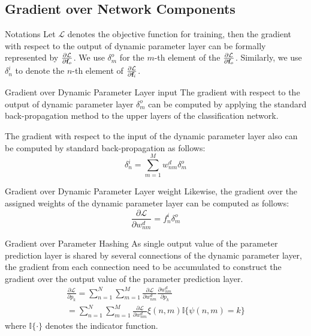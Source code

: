 \documentclass[10pt,twocolumn,letterpaper]{article}
\begin{document}
\subsection{Gradient over Network Components}
{\color{blue} Notations}
Let ${\mathcal{L}}$ denotes the objective function for training, then the gradient {\color{cyan}with respect to} the output of dynamic parameter layer can be formally represented by $\frac{\partial\mathcal{L}}{\partial {\bf{f}}_{o}}$.
We use $\delta^{o}_{m}$ for the $m$-th element of the $\frac{\partial\mathcal{L}}{\partial {\bf{f}}_{o}}$.
Similarly, we use $\delta^{i}_{n}$ to denote the $n$-th element of $\frac{\partial\mathcal{L}}{\partial {\bf{f}}_{i}}$.

{\color{blue} Gradient over Dynamic Parameter Layer input}
The gradient {\color{cyan}with respect to} the output of dynamic parameter layer $\delta^{o}_{m}$ can be computed by {\color{blue}applying the} standard back-propagation {\color{cyan}method to the upper layers of the classification network}. 

The gradient {\color{cyan}with respect to} the input of {\color{cyan}the dynamic} parameter layer also can be computed by standard back-propagation as follows:
\begin{equation}
{\delta}^{i}_n = \sum _{ m=1 }^{ M }{ w^d_{nm}\delta^o_{m} } 
\end{equation}

{\color{blue} Gradient over Dynamic Parameter Layer weight}
Likewise, the gradient over the assigned weights of the dynamic parameter layer can be computed as follows:
\begin{equation}
{\frac{\partial\mathcal{L}}{\partial w^{d}_{nm}}}=f^{i}_{n}{\delta}^{o}_{m}
\end{equation}

{\color{blue} Gradient over Parameter Hashing}
As single output value of the parameter prediction layer is shared by several connections of the dynamic parameter layer, the gradient from each connection need to be accumulated to construct the gradient over the output value of the parameter prediction layer\cite{Hashing}.
\begin{multline}
{\frac{\partial\mathcal{L}}{\partial p_{k}}}
= \sum _{n=1}^{\scriptscriptstyle N}{\sum _{m=1}^{\scriptscriptstyle M}{   {\frac{\partial\mathcal{L}}{\partial w^d_{nm}}} {\frac{\partial w^d_{nm}}{\partial p_{k}}}}} \\
= \sum _{n=1}^{\scriptscriptstyle N}{\sum _{m=1}^{\scriptscriptstyle M} {  {\frac{\partial\mathcal{L}}{\partial w^d_{nm}}}   {\xi(n,m)}  {{\mathbb{I}}\{ \psi(n,m)=k \}}      }}
\end{multline}
where ${\mathbb{I}}\{ \cdot \}$ denotes the indicator function.
\end{document}
